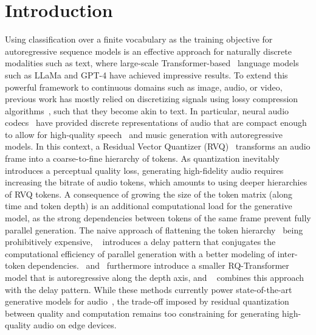 
\section{Introduction}



Using classification over a finite vocabulary as the training objective for autoregressive sequence models is an effective approach for naturally discrete modalities such as text, where large-scale Transformer-based~\citep{attentionvaswani} language models such as LLaMa \citep{llama} and GPT-4  \cite{gpt4} have achieved impressive results. To extend this powerful framework to continuous domains such as image, audio, or video, previous work has mostly relied on discretizing signals using lossy compression algorithms~\citep{vqvae}, such that they become akin to text. In particular, neural audio codecs~\citep{soundstream,encodec} have provided discrete representations of audio that are compact enough to allow for high-quality speech~\citep{audiolm,valle} and music \citep{musiclm,musicgen} generation with autoregressive models. In this context, a Residual Vector Quantizer (RVQ)~\citep{soundstream} transforms an audio frame into a coarse-to-fine hierarchy of tokens. As quantization inevitably introduces a perceptual quality loss, generating high-fidelity audio requires increasing the bitrate of audio tokens, which amounts to using deeper hierarchies of RVQ tokens. A consequence of growing the size of the token matrix (along time and token depth) is an additional computational load for the generative model, as the strong dependencies between tokens of the same frame\citep{lemercier} prevent fully parallel generation. The naive approach of flattening the token hierarchy~\citep{audiolm} being prohibitively expensive, ~\citet{musicgen} introduces a delay pattern that conjugates the computational efficiency of parallel generation with a better modeling of inter-token dependencies.~\citet{rq_transformer} and~\citet{uniaudio} furthermore introduce a smaller RQ-Transformer model that is autoregressive along the depth axis, and ~\citet{moshi} combines this approach with the delay pattern. While these methods currently power state-of-the-art generative models for audio~\citep{moshi, hibiki}, the trade-off imposed by residual quantization between quality and computation remains too constraining for generating high-quality audio on edge devices.

